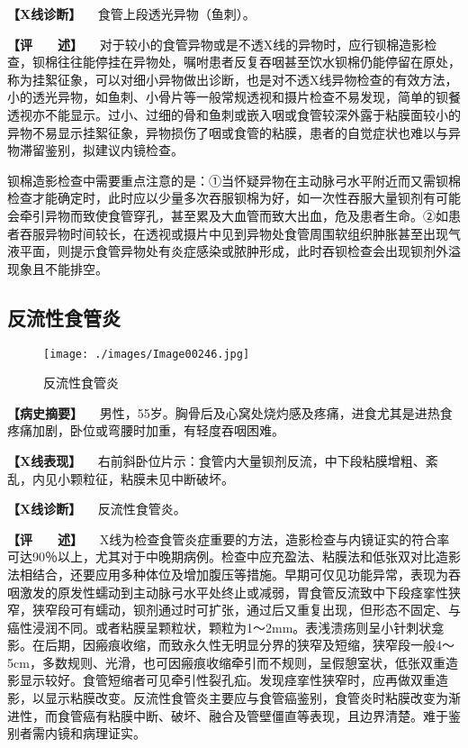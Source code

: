 \textbf{【X线诊断】} 　食管上段透光异物（鱼刺）。

\textbf{【评　　述】}
　对于较小的食管异物或是不透X线的异物时，应行钡棉造影检查，钡棉往往能停挂在异物处，嘱咐患者反复吞咽甚至饮水钡棉仍能停留在原处，称为挂絮征象，可以对细小异物做出诊断，也是对不透X线异物检查的有效方法，小的透光异物，如鱼刺、小骨片等一般常规透视和摄片检查不易发现，简单的钡餐透视亦不能显示。过小、过细的骨和鱼刺或嵌入咽或食管较深外露于粘膜面较小的异物不易显示挂絮征象，异物损伤了咽或食管的粘膜，患者的自觉症状也难以与异物滞留鉴别，拟建议内镜检查。

钡棉造影检查中需要重点注意的是：①当怀疑异物在主动脉弓水平附近而又需钡棉检查才能确定时，此时应以少量多次吞服钡棉为好，如一次性吞服大量钡剂有可能会牵引异物而致使食管穿孔，甚至累及大血管而致大出血，危及患者生命。②如患者吞服异物时间较长，在透视或摄片中见到异物处食管周围软组织肿胀甚至出现气液平面，则提示食管异物处有炎症感染或脓肿形成，此时吞钡检查会出现钡剂外溢现象且不能排空。

\subsection{反流性食管炎}

\begin{figure}[!htbp]
 \centering
 \texttt{[image: ./images/Image00246.jpg]}
 \captionsetup{justification=centering}
 \caption{反流性食管炎}
 \label{fig5-2-3}
  \end{figure} 

\textbf{【病史摘要】}
　男性，55岁。胸骨后及心窝处烧灼感及疼痛，进食尤其是进热食疼痛加剧，卧位或弯腰时加重，有轻度吞咽困难。

\textbf{【X线表现】}
　右前斜卧位片示：食管内大量钡剂反流，中下段粘膜增粗、紊乱，内见小颗粒征，粘膜未见中断破坏。

\textbf{【X线诊断】} 　反流性食管炎。

\textbf{【评　　述】}
　X线为检查食管炎症重要的方法，造影检查与内镜证实的符合率可达90％以上，尤其对于中晚期病例。检查中应充盈法、粘膜法和低张双对比造影法相结合，还要应用多种体位及增加腹压等措施。早期可仅见功能异常，表现为吞咽激发的原发性蠕动到主动脉弓水平处终止或减弱，胃食管反流致中下段痉挛性狭窄，狭窄段可有蠕动，钡剂通过时可扩张，通过后又重复出现，但形态不固定、与癌性浸润不同。或者粘膜呈颗粒状，颗粒为1～2mm。表浅溃疡则呈小针刺状龛影。在后期，因瘢痕收缩，而致永久性无明显分界的狭窄及短缩，狭窄段一般4～5cm，多数规则、光滑，也可因瘢痕收缩牵引而不规则，呈假憩室状，低张双重造影显示较好。食管短缩者可见牵引性裂孔疝。发现痉挛性狭窄时，应再做双重造影，以显示粘膜改变。反流性食管炎主要应与食管癌鉴别，食管炎时粘膜改变为渐进性，而食管癌有粘膜中断、破坏、融合及管壁僵直等表现，且边界清楚。难于鉴别者需内镜和病理证实。

